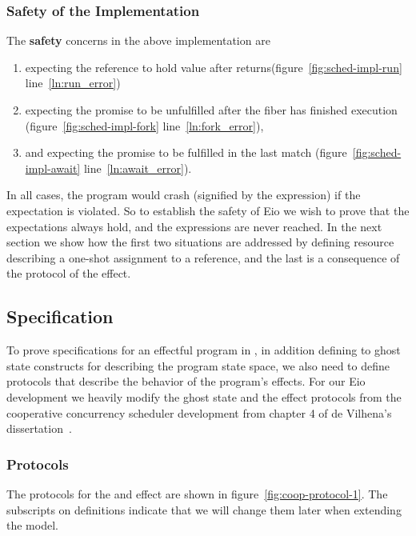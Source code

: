 \subsubsection{Safety of the Implementation}
The \textbf{safety} concerns in the above implementation are
\begin{enumerate}
  \item {} expecting the  reference to hold  value after  returns(figure~\ref{fig:sched-impl-run} line~\ref{ln:run_error})
  \item {} expecting the promise to be unfulfilled after the fiber has finished execution (figure~\ref{fig:sched-impl-fork} line~\ref{ln:fork_error}),
  \item and  expecting the promise to be fulfilled in the last match (figure~\ref{fig:sched-impl-await} line~\ref{ln:await_error}).
\end{enumerate}
In all cases, the program would crash (signified by the  expression) if the expectation is violated.
So to establish the safety of Eio we wish to prove that the expectations always hold, and the  expressions are never reached.
In the next section we show how the first two situations are addressed by defining resource describing a one-shot assignment to a reference, and the last is a consequence of the protocol of the \esuspend{} effect.

\subsection{Specification}
\label{sec:sched-spec}

To prove specifications for an effectful program in \hazel{}, in addition defining to ghost state constructs for describing the program state space, we also need to define protocols that describe the behavior of the program's effects.
For our Eio development we heavily modify the ghost state and the effect protocols from the cooperative concurrency scheduler development from chapter 4 of de Vilhena's dissertation~\cite{de2022proof}.

\subsubsection{Protocols}
\label{sec:sched-spec-protocols}

The protocols for the \efork{} and \esuspend{} effect are shown in figure~\ref{fig:coop-protocol-1}.
The subscripts on definitions indicate that we will change them later when extending the model.

